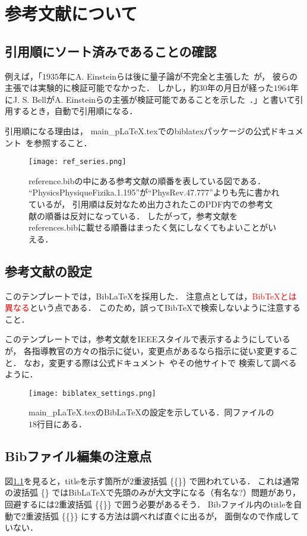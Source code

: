 \chapter{参考文献について}
\section{引用順にソート済みであることの確認}
例えば，「$1935$年にA. Einsteinらは後に量子論が不完全と主張した~\cite{PhysRev.47.777}が，
彼らの主張では実験的に検証可能でなかった．
しかし，約$30$年の月日が経った$1964$年にJ. S. BellがA. Einsteinらの主張が検証可能であることを示した~\cite{PhysicsPhysiqueFizika.1.195}．」と書いて引用するとき，自動で引用順になる．

引用順になる理由は，
main\_pLaTeX.texでのbiblatexパッケージの公式ドキュメント~\cite{biblatex}を参照すること．

\begin{figure}[h]
  \centering
  \texttt{[image: ref\_series.png]}
  \caption{reference.bibの中にある参考文献の順番を表している図である．
  ``PhysicsPhysiqueFizika.1.195''が``PhysRev.47.777''よりも先に書かれているが，
  引用順は反対なため出力されたこのPDF内での参考文献の順番は反対になっている．
  したがって，参考文献をreferences.bibに載せる順番はまったく気にしなくてもよいことがいえる．}
  \label{fig:ref_series}
\end{figure}

\section{参考文献の設定}
このテンプレートでは，Bib\LaTeX を採用した．
注意点としては，\textcolor{red}{Bib\TeX とは異なる}という点である．
このため，誤ってBib\TeX で検索しないように注意すること．

このテンプレートでは，参考文献をIEEEスタイルで表示するようにしているが，
各指導教官の方々の指示に従い，変更点があるなら指示に従い変更すること．
なお，変更する際は公式ドキュメント~\cite{biblatex}やその他サイトで
検索して調べるように．

\begin{figure}[h]
  \centering
  \texttt{[image: biblatex\_settings.png]}
  \caption{main\_pLaTeX.texのBib\LaTeX の設定を示している．同ファイルの$18$行目にある．}
  \label{fig:biblatex_settings}
\end{figure}

\section{Bibファイル編集の注意点}
図\ref{fig:ref_series}を見ると，titleを示す箇所が$2$重波括弧 \{\{\}\} で囲われている．
これは通常の波括弧 \{\} ではBib\LaTeX で先頭のみが大文字になる（有名な?）問題があり，
回避するには$2$重波括弧 \{\{\}\} で囲う必要があるそう．
Bibファイル内のtitleを自動で$2$重波括弧 \{\{\}\} にする方法は調べれば直ぐに出るが，
面倒なので作成していない．
